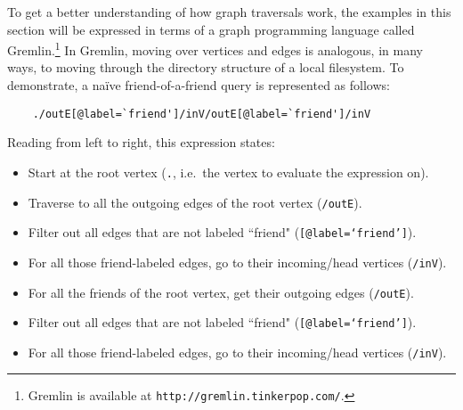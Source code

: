 \documentclass{svmult}
\newcommand{\ttt}{\texttt}
\begin{document}
To get a better understanding of how graph traversals work, the examples in this section will be expressed in terms of a graph programming language called Gremlin.\footnote{Gremlin is available at \ttt{http://gremlin.tinkerpop.com/}.} In Gremlin, moving over vertices and edges is analogous, in many ways, to moving through the directory structure of a local filesystem. To demonstrate, a na\"ive friend-of-a-friend query is represented as follows:
\begin{verbatim}
	./outE[@label=`friend']/inV/outE[@label=`friend']/inV
\end{verbatim}
Reading from left to right, this expression states:
\begin{itemize}
	\item Start at the root vertex (\ttt{.}, i.e.~the vertex to evaluate the expression on).
	\item Traverse to all the outgoing edges of the root vertex (\ttt{/outE}).
	\item Filter out all edges that are not labeled ``friend" (\ttt{[@label=`friend']}).
	\item For all those friend-labeled edges, go to their incoming/head vertices (\ttt{/inV}).
	\item For all the friends of the root vertex, get their outgoing edges (\ttt{/outE}).
	\item Filter out all edges that are not labeled ``friend" (\ttt{[@label=`friend']}).
	\item For all those friend-labeled edges, go to their incoming/head vertices (\ttt{/inV}).
\end{itemize}
\end{document}

